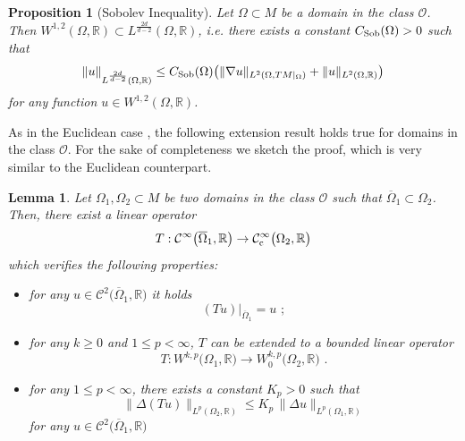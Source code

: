 \documentclass[10pt, a4paper, reqno, oneside]{amsart}
\theoremstyle{plain}
\newtheorem{prop}[theo]{Proposition}
\theoremstyle{definition}
\theoremstyle{plain}
\newtheorem{lemma}[theo]{Lemma}
\theoremstyle{definition}
\theoremstyle{plain}
\renewcommand{\=}{:=}
\begin{document}
\begin{prop}[Sobolev Inequality]
Let $\Omega \subset M$ be a domain in the class $\mathcal{O}$. Then $W^{1,2}(\Omega,\mathbb{R}) \subset L^{\frac{2d}{d-2}}(\Omega,\mathbb{R})$, i.e. there exists a constant $C_{\rm Sob}(\Omega)>0$ such that
\begin{equation} \label{sob}
\|u\|_{L^{\frac{2d}{d-2}}(\Omega,\mathbb{R})}\leq C_{\rm Sob}(\Omega)\big(\|\nabla u\|_{L^2(\Omega,TM|_{\Omega})}+\|u\|_{L^2(\Omega,\mathbb{R})}\big)
\end{equation}
for any function $u\in W^{1,2}(\Omega,\mathbb{R})$.
\end{prop}

As in the Euclidean case \cite[Thm 5.22]{AdamsF}, the following extension result holds true for domains in the class $\mathcal{O}$. For the sake of completeness we sketch the proof, which is very similar to the Euclidean counterpart.

\begin{lemma} \label{lem:extSob}
Let $\Omega_1, \Omega_2 \subset M$ be two domains in the class $\mathcal{O}$ such that $\overline{\Omega}_1 \subset \Omega_2$. Then, there exist a linear operator
$$
T: \mathcal{C}^{\infty}\big(\overline{\Omega}_1,\mathbb{R}\big) \to \mathcal{C}^{\infty}_{\rm c}\big(\Omega_2,\mathbb{R}\big)
$$
which verifies the following properties: \begin{itemize}
\item[$a)$] for any $u \in \mathcal{C}^2\big(\overline{\Omega}_1,\mathbb{R}\big)$ it holds
$$
(Tu)|_{\overline{\Omega}_1} = u \,\, ;
$$
\item[$b)$] for any $k \geq0$ and $1 \leq p < \infty$, $T$ can be extended to a bounded linear operator
$$
T: W^{k,p}\big(\Omega_1,\mathbb{R}\big) \to W^{k,p}_0\big(\Omega_2,\mathbb{R}\big) \,\, .
$$
\item[$c)$] for any $1 \leq p < \infty$, there exists a constant $K_p>0$ such that
$$
\|\Delta (Tu)\|_{L^p(\Omega_2,\mathbb{R})} \leq K_p \, \|\Delta u\|_{L^p(\Omega_1,\mathbb{R})}
$$
for any $u \in \mathcal{C}^2\big(\overline{\Omega}_1,\mathbb{R}\big)$
\end{itemize}
\end{lemma}
\end{document}
